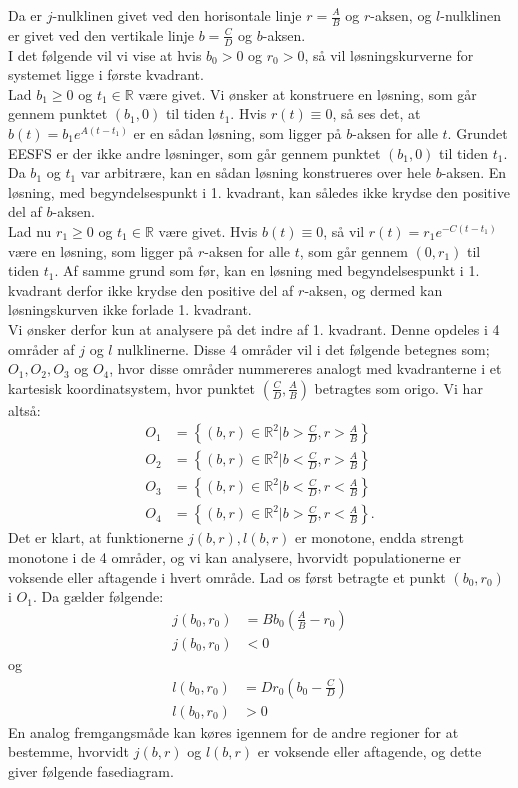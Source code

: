 Da er $j$-nulklinen givet ved den horisontale linje $r=\frac{A}{B}$ og $r$-aksen, og $l$-nulklinen er givet ved den vertikale linje $b=\frac{C}{D}$ og $b$-aksen. \\
\hfill \break
I det følgende vil vi vise at hvis $b_0>0$ og $r_0>0$, så vil løsningskurverne for systemet ligge i første kvadrant. \\
\hfill \break
Lad $b_1 \geq 0$ og $t_1\in \mathbb{R}$ være givet. Vi ønsker at konstruere en løsning, som går gennem punktet $(b_1,0)$ til tiden $t_1$. Hvis $r(t)\equiv 0$, så ses det, at $b(t)=b_1e^{A(t-t_1)}$ er en sådan løsning, som ligger på $b$-aksen for alle $t$. Grundet EESFS er der ikke andre løsninger, som går gennem punktet $(b_1,0)$ til tiden $t_1$. Da $b_1$ og $t_1$ var arbitrære, kan en sådan løsning konstrueres over hele $b$-aksen. En løsning, med begyndelsespunkt i 1. kvadrant, kan således ikke krydse den positive del af $b$-aksen. \\ 
\hfill \break
 Lad nu $r_1 \geq 0$ og $t_1 \in \mathbb{R}$ være givet. Hvis $b(t)\equiv 0$, så vil $r(t)=r_1e^{-C(t-t_1)}$ være en løsning, som ligger på $r$-aksen for alle $t$, som går gennem $(0,r_1)$ til tiden $t_1$. Af samme grund som før, kan en løsning med begyndelsespunkt i 1. kvadrant derfor ikke krydse den positive del af $r$-aksen, og dermed kan løsningskurven ikke forlade 1. kvadrant. 
\\ 
\hfill \break
Vi ønsker derfor kun at analysere på det indre af 1. kvadrant. Denne opdeles i 4 områder af $j$ og $l$ nulklinerne. Disse 4 områder vil i det følgende betegnes som; $O_1, O_2, O_3$ og $O_4$, hvor disse områder nummereres analogt med kvadranterne i et kartesisk koordinatsystem, hvor punktet $( \frac{C}{D},\frac{A}{B})$ betragtes som origo. Vi har altså:
\begin{align*}
    O_1 &= \left\{(b,r) \in \mathbb{R}^2 | b > \frac{C}{D}, r > \frac{A}{B}\right\}\\
    O_2 &= \left\{(b,r) \in \mathbb{R}^2 | b < \frac{C}{D}, r > \frac{A}{B}\right\}\\
    O_3 &= \left\{(b,r) \in \mathbb{R}^2 | b < \frac{C}{D}, r < \frac{A}{B}\right\}\\
    O_4 &= \left\{(b,r) \in \mathbb{R}^2 | b > \frac{C}{D}, r < \frac{A}{B}\right\}.
\end{align*}
\hfill \break
 Det er klart, at funktionerne $j(b,r), l(b,r)$ er monotone, endda strengt monotone i de 4 områder, og vi kan analysere, hvorvidt populationerne er voksende eller aftagende i hvert område. Lad os først betragte et punkt $(b_0,r_0)$ i $O_1$. Da gælder følgende:
\begin{align*}
    j(b_0, r_0) &= Bb_0\left(\frac{A}{B} - r_0 \right)\\
    j(b_0, r_0) &< 0
\end{align*}
og
\begin{align*}
    l(b_0, r_0) &= Dr_0\left(b_0 - \frac{C}{D} \right)\\
    l(b_0, r_0) &> 0
\end{align*}
En analog fremgangsmåde kan køres igennem for de andre regioner for at bestemme, hvorvidt $j(b,r)$ og $l(b,r)$ er voksende eller aftagende, og dette giver følgende fasediagram.\\
\hfill \break

